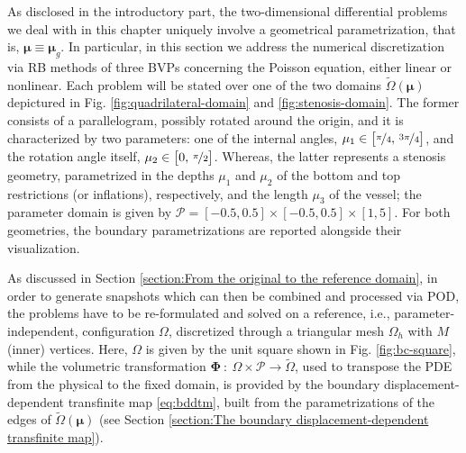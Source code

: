 \documentclass[12pt, a4paper, twoside, openright, notitlepage]{report}
\numberwithin{equation}{chapter}
\theoremstyle{theorem}
\theoremstyle{definition}
\theoremstyle{remark}
\theoremstyle{proposition}
\numberwithin{figure}{chapter}
\newcommand{\wt}[1]{\widetilde{#1}}
\newcommand{\bg}[1]{\boldsymbol{#1}}
\begin{document}
		As disclosed in the introductory part, the two-dimensional differential problems we deal with in this chapter uniquely involve a geometrical parametrization, that is, $\bg{\mu} \equiv \bg{\mu}_g$. In particular, in this section we address the numerical discretization via RB methods of three BVPs concerning the Poisson equation, either linear or nonlinear. Each problem will be stated over one of the two domains $\wt{\Omega}(\bg{\mu})$ depictured in Fig. \ref{fig:quadrilateral-domain} and \ref{fig:stenosis-domain}. The former consists of a parallelogram, possibly rotated around the origin, and it is characterized by two parameters: one of the internal angles, $\mu_1 \in \big[ \nicefrac{\pi}{4}, \, \nicefrac{3 \pi}{4} \big]$, and the rotation angle itself, $\mu_2 \in \big[ 0, \, \nicefrac{\pi}{2} \big]$. Whereas, the latter represents a stenosis geometry, parametrized in the depths $\mu_1$ and $\mu_2$ of the bottom and top restrictions (or inflations), respectively, and the length $\mu_3$ of the vessel; the parameter domain is given by $\mathcal{P} = [-0.5,0.5] \times [-0.5,0.5] \times [1,5]$. For both geometries, the boundary parametrizations are reported alongside their visualization.
		
		As discussed in Section \ref{section:From the original to the reference domain}, in order to generate snapshots which can then be combined and processed via POD, the problems have to be re-formulated and solved on a reference, i.e., parameter-independent, configuration $\Omega$, discretized through a triangular mesh $\Omega_h$ with $M$ (inner) vertices. Here, $\Omega$ is given by the unit square shown in Fig. \ref{fig:bc-square}, while the volumetric transformation $\bg{\Phi} ~ : ~ \Omega \times \mathcal{P} \rightarrow \wt{\Omega}$, used to transpose the PDE from the physical to the fixed domain, is provided by the boundary displacement-dependent transfinite map \eqref{eq:bddtm}, built from the parametrizations of the edges of $\wt{\Omega}(\bg{\mu})$ (see Section \ref{section:The boundary displacement-dependent transfinite map}).
		
		\vspace*{-0cm}
		
\end{document}
